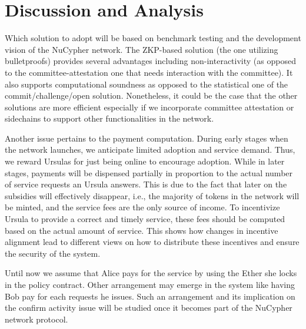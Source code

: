\section{Discussion and Analysis}
\label{discussion}
Which solution to adopt will be based on benchmark testing and the development vision of the NuCypher network. The ZKP-based solution (the one utilizing bulletproofs) provides several advantages including non-interactivity (as opposed to the committee-attestation one that needs interaction with the committee). It also supports computational soundness as opposed to the statistical one of the commit/challenge/open solution. Nonetheless, it could be the case that the other solutions are more efficient especially if we incorporate committee attestation or sidechains to support other functionalities in the network. 


Another issue pertains to the payment computation. During early stages when the network launches, we anticipate  limited adoption and service demand. Thus, we reward Ursulas for just being online to encourage adoption. While in later stages, payments will be dispensed partially in proportion to the actual number of service requests an Ursula answers. This is due to the fact that later on the subsidies will effectively disappear, i.e., the majority of tokens in the network will be minted, and the service fees are the only source of income. To incentivize Ursula to provide a correct and timely service, these fees should be computed based on the actual amount of service. This shows how changes in incentive alignment lead to different views on how to distribute these incentives and ensure the security of the system.

Until now we assume that Alice pays for the service by using the Ether she locks in the policy contract. Other arrangement may emerge in the system like having Bob pay for each requests he issues. Such an arrangement and its implication on the confirm activity issue will be studied once it becomes part of the NuCypher network protocol.
